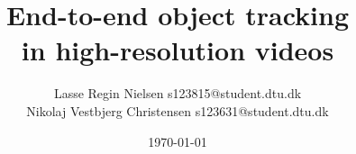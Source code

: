 \documentclass[a4paper]{article}
\numberwithin{equation}{section}
\begin{document}
\title{End-to-end object tracking \\ in high-resolution videos}
\author{Lasse Regin Nielsen s123815@student.dtu.dk \\ Nikolaj Vestbjerg Christensen s123631@student.dtu.dk}
\date{\today}

\maketitle








\pagebreak
\appendix


\pagebreak
\printbibliography
\end{document}
